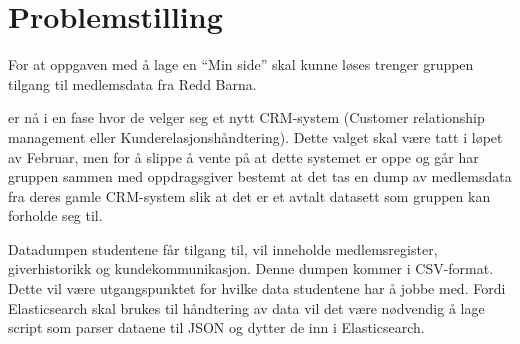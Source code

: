 \chapter{Problemstilling}
For at oppgaven med å lage en ``Min side'' skal kunne løses trenger gruppen tilgang til medlemsdata fra Redd Barna.

\rb{} er nå i en fase hvor de velger seg et nytt CRM-system (Customer relationship management eller Kunderelasjonshåndtering). Dette valget skal være tatt i løpet av Februar, men for å slippe å vente på at dette systemet er oppe og går har gruppen sammen med oppdragsgiver bestemt at det tas en dump av medlemsdata fra deres gamle CRM-system slik at det er et avtalt datasett som gruppen kan forholde seg til. 

Datadumpen studentene får tilgang til, vil inneholde medlemsregister, giverhistorikk og kundekommunikasjon. Denne dumpen kommer i CSV-format. Dette vil være utgangspunktet for hvilke data studentene har å jobbe med. Fordi Elasticsearch skal brukes til håndtering av data vil det være nødvendig å lage script som parser dataene til JSON og dytter de inn i Elasticsearch.